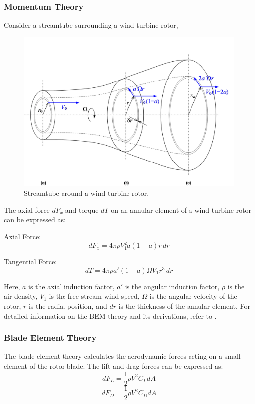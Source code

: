 \subsubsection{Momentum Theory}
Consider a streamtube surrounding a wind turbine rotor,
\begin{figure}[ht]
    \centering
    \includegraphics[width=\textwidth]{Figures/aerodynamics_streamtube.png}
    \caption{Streamtube around a wind turbine rotor.}
    \label{fig:streamtube}
\end{figure}


The axial force $dF_x$ and torque $dT$ on an annular element of a wind turbine rotor can be expressed as:

Axial Force:
\begin{equation}
dF_x = 4\pi \rho V_1^2 a(1 - a) r \, dr
\end{equation}

Tangential Force:
\begin{equation}
dT = 4\pi \rho a' (1 - a) \Omega V_1 r^3 \, dr
\end{equation}

Here, $a$ is the axial induction factor, $a'$ is the angular induction factor, $\rho$ is the air density, $V_1$ is the free-stream wind speed, $\Omega$ is the angular velocity of the rotor, $r$ is the radial position, and $dr$ is the thickness of the annular element. For detailed information on the BEM theory and its derivations, refer to \cite{ingram2011blade}.
\subsubsection{Blade Element Theory}
The blade element theory calculates the aerodynamic forces acting on a small element of the rotor blade. The lift and drag forces can be expressed as:
\begin{equation}
dF_L = \frac{1}{2} \rho V^2 C_L dA
\end{equation}
\begin{equation}
dF_D = \frac{1}{2} \rho V^2 C_D dA
\end{equation}

